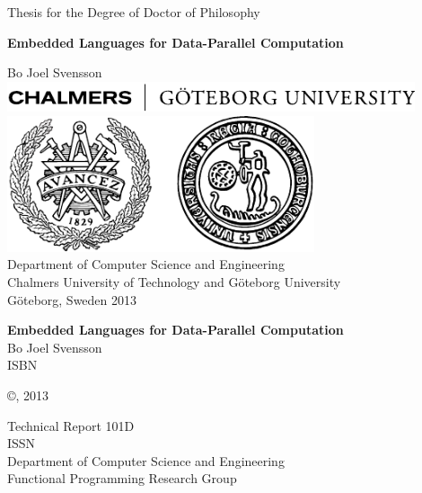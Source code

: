 \documentclass[a4paper]{book}
\newcommand{\thesistitle}{Embedded Languages for Data-Parallel Computation}
\newcommand{\dept}{Department of Computer Science and Engineering}
\newcommand{\uni}{Chalmers University of Technology and G\"oteborg University}
\newcommand{\group}{Functional Programming Research Group}
\begin{document}
\begin{titlepage}
\begin{centering}
{\sc Thesis for the Degree of Doctor of Philosophy}
\vspace{30ex}

{\LARGE\bf\thesistitle}

\vspace{7ex}

\large Bo Joel Svensson
\vfill
\includegraphics[width=120mm]{./img/ChalmGUtextsvEng}\\[5mm]
\includegraphics[height=4cm]{./img/ChalmGUmarke}\\

\vspace{1cm}
\normalsize
{\sc \dept}\\
{\sc \uni}\\
G\"oteborg, Sweden 2013

\end{centering}
\end{titlepage}


\quad \vfill

{\noindent\large\bf\thesistitle} \\
\noindent Bo Joel Svensson \\
\noindent ISBN \\

\vspace{1cm}

\noindent\copyright {}, 2013 \\ 
\vspace{1cm} 

\noindent Technical Report 101D\\
\noindent ISSN                 \\
\noindent \dept \\
\noindent \group\\
\end{document}
